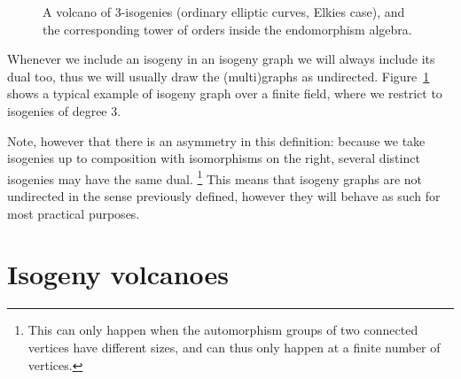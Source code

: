 \documentclass[10pt]{article}
\theoremstyle{plain}
\theoremstyle{definition}
\DeclareMathOperator{\End}{End} %
\def\O{\ensuremath{\mathcal{O}}}
\begin{document}
\begin{figure}
  \centering
  
    \caption{A volcano of $3$-isogenies (ordinary elliptic curves,
      Elkies case), and the corresponding tower of orders inside the
      endomorphism algebra.}
  \label{fig:volcano}
\end{figure}

Whenever we include an isogeny in an isogeny graph we will always
include its dual too, thus we will usually draw the (multi)graphs as
undirected. %
Figure~\ref{fig:volcano} shows a typical example of isogeny graph over
a finite field, where we restrict to isogenies of degree $3$. %

Note, however that there is an asymmetry in this definition: because
we take isogenies up to composition with isomorphisms on the right,
several distinct isogenies may have the same dual.%
\footnote{This can only happen when the automorphism groups of two
  connected vertices have different sizes, and can thus only happen at
  a finite number of vertices.} %
This means that isogeny graphs are not undirected in the sense
previously defined, however they will behave as such for most
practical purposes. %


\section{Isogeny volcanoes}
\label{sec:ell-isogeny-graphs}
\end{document}
